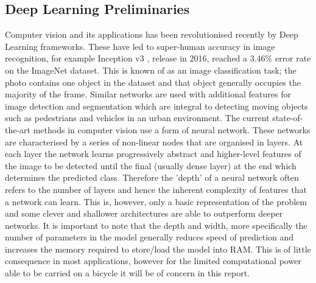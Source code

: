\documentclass[a4paper,11pt,notitlepage]{article}
\begin{document}
\subsection{Deep Learning Preliminaries}
Computer vision and its applications has been revolutionised recently by Deep Learning frameworks. These have led to super-human accuracy in image recognition, for example Inception v3 \cite{Szegedy_2016_CVPR}, release in 2016, reached a 3.46\% error rate on the ImageNet \cite{ILSVRC15} dataset. This is known of as an image classification task; the photo contains one object in the dataset and that object generally occupies the majority of the frame. Similar networks are used with additional features for image detection and segmentation which are integral to detecting moving objects such as pedestrians and vehicles in an urban environment.
\newline\newline
The current state-of-the-art methods in computer vision use a form of neural network. These networks are characterised by a series of non-linear nodes that are organised in layers. At each layer the network learns progressively abstract and higher-level features of the image to be detected until the final (usually dense layer) at the end which determines the predicted class. Therefore the 'depth' of a neural network often refers to the number of layers and hence the inherent complexity of features that a network can learn. This is, however, only a basic representation of the problem and some clever and shallower architectures are able to outperform deeper networks. It is important to note that the depth and width, more specifically the number of parameters in the model generally reduces speed of prediction and increases the memory required to store/load the model into RAM. This is of little consequence in most applications, however for the limited computational power able to be carried on a bicycle it will be of concern in this report.
\end{document}

